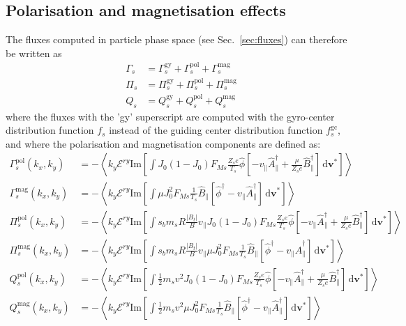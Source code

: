 \documentclass[a4paper]{report}
\begin{document}
\subsection{Polarisation and magnetisation effects}
The fluxes computed in particle phase space (see Sec.~\ref{sec:fluxes}) can therefore be written as
\begin{align*}
\Gamma_s & = \Gamma_s^\textrm{gy} + \Gamma_s^\textrm{pol} + \Gamma_s^\textrm{mag} \\
\Pi_s & = \Pi_s^\textrm{gy} + \Pi_s^\textrm{pol} + \Pi_s^\textrm{mag} \\
Q_s & = Q_s^\textrm{gy} + Q_s^\textrm{pol} + Q_s^\textrm{mag}
\end{align*}
where the fluxes with the 'gy' superscript are computed with the gyro-center distribution function $f_s$ instead of the guiding center distribution function $f_s^\textrm{gc}$, and where the polarisation and magnetisation components are defined as: 
\begin{align*}
\Gamma_s^\textrm{pol}(k_x,k_y) & = - \left<k_y\mathcal{E}^{ry} \textrm{Im}\left[\int J_0(1-J_0)F_{Ms}\frac{Z_s e}{T_s}\hat{\phi}\left[-v_\parallel \hat{A}_\parallel^\dagger + \frac{\mu}{Z_s e}\hat{B}_\parallel^\dagger \right]  \,\textrm{d}\mathbf{v^*} \right]\right>\\
\Gamma_s^\textrm{mag}(k_x,k_y) & = - \left<k_y\mathcal{E}^{ry} \textrm{Im}\left[\int \mu J_0^2F_{Ms}\frac{1}{T_s}\hat{B}_\parallel\left[\hat{\phi}^\dagger-v_\parallel \hat{A}_\parallel^\dagger \right]  \,\textrm{d}\mathbf{v^*} \right]\right>\\
\Pi_s^\textrm{pol}(k_x,k_y) & = - \left<k_y\mathcal{E}^{ry} \textrm{Im}\left[\int s_bm_sR\frac{|B_t|}{B}v_\parallel J_0(1-J_0)F_{Ms}\frac{Z_s e}{T_s}\hat{\phi}\left[-v_\parallel \hat{A}_\parallel^\dagger + \frac{\mu}{Z_s e}\hat{B}_\parallel^\dagger \right]  \,\textrm{d}\mathbf{v^*} \right]\right>\\
\Pi_s^\textrm{mag}(k_x,k_y) & = - \left<k_y\mathcal{E}^{ry} \textrm{Im}\left[\int s_bm_sR\frac{|B_t|}{B}v_\parallel\mu J_0^2F_{Ms}\frac{1}{T_s}\hat{B}_\parallel\left[\hat{\phi}^\dagger-v_\parallel \hat{A}_\parallel^\dagger \right]  \,\textrm{d}\mathbf{v^*} \right]\right>\\
Q_s^\textrm{pol}(k_x,k_y) & = - \left<k_y\mathcal{E}^{ry} \textrm{Im}\left[\int  \frac{1}{2}m_sv^2J_0(1-J_0)F_{Ms}\frac{Z_s e}{T_s}\hat{\phi}\left[-v_\parallel \hat{A}_\parallel^\dagger + \frac{\mu}{Z_s e}\hat{B}_\parallel^\dagger \right]  \,\textrm{d}\mathbf{v^*} \right]\right>\\
Q_s^\textrm{mag}(k_x,k_y) & = - \left<k_y\mathcal{E}^{ry} \textrm{Im}\left[\int  \frac{1}{2}m_sv^2\mu J_0^2F_{Ms}\frac{1}{T_s}\hat{B}_\parallel\left[\hat{\phi}^\dagger-v_\parallel \hat{A}_\parallel^\dagger \right]  \,\textrm{d}\mathbf{v^*} \right]\right>
\end{align*}
\end{document}
